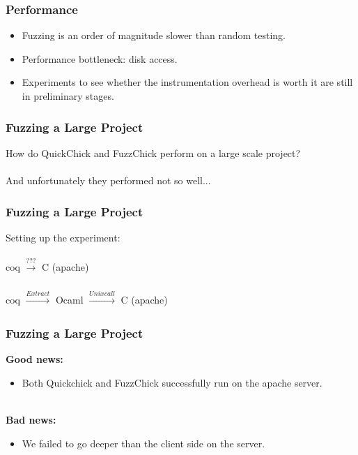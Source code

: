 \documentclass{beamer}
\begin{document}
\begin{frame}
  \frametitle{Performance}
  \begin{itemize}
  \item Fuzzing is an order of magnitude slower than random testing.
  \item Performance bottleneck: disk access.
  \item Experiments to see whether the instrumentation overhead is worth it are
    still in preliminary stages.
  \end{itemize}
\end{frame}

\begin{frame}
  \frametitle{Fuzzing a Large Project}
  How do QuickChick and FuzzChick perform on a large scale project? \\~\\
 
  \pause
  And unfortunately they performed not so well...
    
\end{frame}

\begin{frame}
\frametitle{Fuzzing a Large Project}
Setting up the experiment: \\~\\

coq $\xrightarrow[]{???}$ C (apache) \\~\\

\pause{}
coq $\xrightarrow[]{Extract}$ Ocaml $\xrightarrow[]{Unix call}$ C (apache)

\end{frame}

\begin{frame}
\frametitle{Fuzzing a Large Project}

\textbf{Good news:}

\begin{itemize}
\item Both Quickchick and FuzzChick successfully run on the apache server. \\~\\
\end{itemize}


\pause{}
\textbf{Bad news:}

\begin{itemize}
\item We failed to go deeper than the client side on the server.
\end{itemize}


\end{frame}
\end{document}
